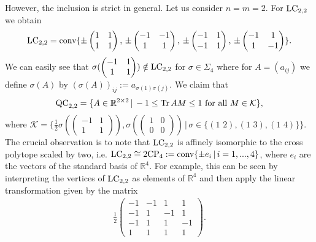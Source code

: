 However, the inclusion is strict in general. Let us consider $ n=m=2 $. 
For $ \textup{LC}_{2,2} $ we obtain 
\begin{align*}
	\textup{LC}_{2,2}= \textup{conv} \{ \pm \begin{pmatrix}
	1 & 1 \\
	1 & 1
	\end{pmatrix} , \, \pm \begin{pmatrix}
	-1 & -1 \\
	1 & 1
	\end{pmatrix} , \, \pm \begin{pmatrix}
	-1 & 1 \\
	-1 & 1
	\end{pmatrix}, \, \pm \begin{pmatrix}
	-1 & 1 \\
	1 & -1
	\end{pmatrix}  \}.
\end{align*}
We can easily see that $ \sigma(\begin{pmatrix}
-1 & 1 \\ 1 & 1 
\end{pmatrix}) \notin \textup{LC}_{2,2} $ for $ \sigma \in \Sigma_4 $ where for $ A = (a_{ij}) $ we define $ \sigma (A)  $ by $ (\sigma( A))_{ij}:= a_{\sigma(1)\sigma(j)} $.
We claim that
\begin{equation}\label{facetsLC}
	\textup{QC}_{2,2} = \{ A \in \mathbb{R}^{2 \times 2} \, | \, -1 \le  \text{Tr} \, {AM}  \le 1 \textup{ for all } M \in \mathcal{K} \},
\end{equation}
where $ \mathcal{K}  = \{ \frac{1}{2}\sigma(\begin{pmatrix}
-1 & 1 \\
1 & 1
\end{pmatrix}), \sigma(\begin{pmatrix}
1 & 0 \\
0 & 0
\end{pmatrix}) \, | \,  \sigma \in \{  (1 \, \, 2), (1 \, \, 3), (1 \, \, 4) \} \} $.
The crucial observation is to note that $ \textup{LC}_{2,2} $ is affinely isomorphic to the cross polytope scaled  by two, i.e. 
$ \textup{LC}_{2,2} \cong 2\textup{CP}_4 := \textup{conv} \{  \pm e_i \, | \, i = 1,...,4 \} $, where $ e_i $ are the vectors of the standard basis of $ \mathbb{R}^4 $. For example, this can be seen by interpreting the vertices of $ \textup{LC}_{2,2} $ as elements of $ \mathbb{R}^4 $ and then apply the linear transformation given by the matrix 
\begin{align*}
	\frac{1}{2}\begin{pmatrix}
		-1 & -1 & 1 & 1 \\
		-1 & 1 & -1 & 1 \\
		-1 & 1 & 1 & -1 \\
		1 & 1 & 1 & 1 
	\end{pmatrix}.
\end{align*}
